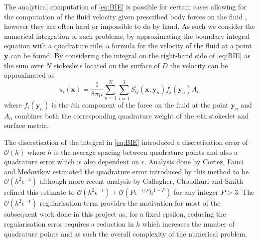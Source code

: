 The analytical computation of \cref{eq:BIE} is possible for certain cases allowing for the computation of the fluid velocity given prescribed body forces on the fluid \cite{Walker2020AFilaments,Zhao2021RegularizedFlow,Ohm2021RemarksTheory,Zhao2019}, however they are often hard or impossible to do by hand. As such we consider the numerical integration of such problems, by approximating the boundary integral equation with a quadrature rule, a formula for the velocity of the fluid at a point $\bm{y}$ can be found. By considering the integral on the right-hand side of \cref{eq:BIE} as the sum over $N$ stokeslets located on the surface of $D$ the velocity can be approximated as
\begin{equation}
\label{eq:Stokesletsum}
    u_{i}\left(\bm{x}\right)=\frac{1}{8 \pi \mu} \sum_{n=1}^{N} \sum_{i=1}^{3} S_{i j}^{\epsilon}\left(\bm{x}, {\bm{y}}_{n}\right) {f}_{j}({\bm{y}}_{n}) A_{n}
\end{equation}
where ${f}_{i}({\bm{y}}_n)$ is the $i$th component of the force on the fluid at the point ${\bm{y}}_n$ and $A_n$ combines both the corresponding quadrature weight of the $n$th stokeslet and surface metric.

The discretisation of the integral in \cref{eq:BIE} introduced a discretisation error of $\mathcal{O}(h)$ where $h$ is the average spacing between quadrature points and also a quadrature error which is also dependent on $\epsilon$. Analysis done by Cortez, Fauci and Medovikov \cite{Cortez2005} estimated the quadrature error introduced by this method to be $\mathcal{O}(h^2\epsilon^{-3})$ although more recent analysis by Gallagher, Choudhuri and Smith \cite{Gallagher2019SharpEquation} refined this estimate to $\mathcal{O}(h^2\epsilon^{-1}) + \mathcal{O}(P\epsilon^{-1/P} h^{1-P})$ for any integer $P>3$. The $\mathcal{O}(h^2\epsilon^{-1})$ regularisation term provides the motivation for most of the subsequent work done in this project as, for a fixed epsilon, reducing the regularisation error requires a reduction in $h$ which increases the number of quadrature points and as such the overall complexity of the numerical problem. 

